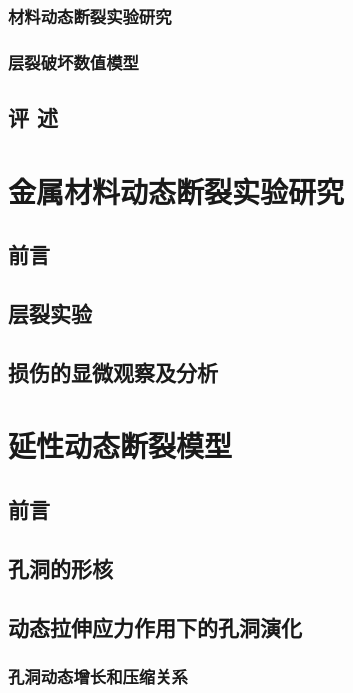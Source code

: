 \documentclass[degree=postdoc]{thuthesis}
\begin{document}
\clearpage
\setcounter{page}{41}
\subsection{材料动态断裂实验研究}
\subsection{层裂破坏数值模型}
\section{评  述}

\clearpage
\setcounter{page}{51}
\chapter{金属材料动态断裂实验研究}
\section{前言}

\clearpage
\setcounter{page}{52}
\section{层裂实验}

\clearpage
\setcounter{page}{83}
\section{损伤的显微观察及分析}
\chapter{延性动态断裂模型}
\section{前言}

\clearpage
\setcounter{page}{84}
\section{孔洞的形核}

\clearpage
\setcounter{page}{86}
\section{动态拉伸应力作用下的孔洞演化}
\subsection{孔洞动态增长和压缩关系}
\end{document}
